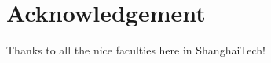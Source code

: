 \chapter*{Acknowledgement}
\thispagestyle{empty}

Thanks to all the nice faculties here in ShanghaiTech!
